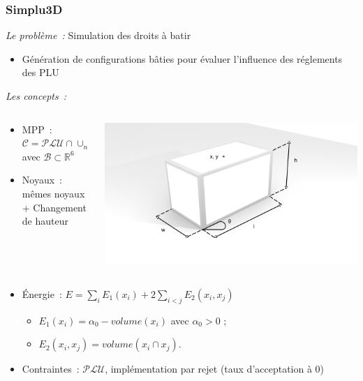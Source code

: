 \documentclass{beamer}
\begin{document}
\begin{frame}
\frametitle{Simplu3D}
\emph{Le probl\`eme~:}  Simulation des droits \`a batir
\begin{itemize}
\item Génération de configurations bâties pour évaluer l'influence des réglements des PLU
\end{itemize}
\emph{Les concepts~:}
\begin{columns}
\begin{column}{0.55\textwidth}
\begin{itemize}
\item MPP~:  $ \mathcal{C} =\mathcal{PLU} \cap \cup_{n} \mathcal{B}^n$  avec $\mathcal{B}  \subset  \mathds{R}^{6}$
\item Noyaux~: mêmes noyaux + Changement de hauteur
\end{itemize}
\end{column}
\begin{column}{0.45\textwidth}
 \includegraphics[width=\textwidth]{boiteFin.png}
\end{column}
\end{columns}
\begin{itemize}
\item Énergie~:  $E = \sum_i E_1(x_i) + 2\sum_{i<j} E_2(x_i,x_j)$
\begin{itemize}
\item $E_1(x_i)=\alpha_{0} - volume(x_i)$ avec $\alpha_{0}>0$ ;
\item $E_2(x_i,x_j) = volume(x_i \cap x_j)$.
\end{itemize}
\item Contraintes~:  $\mathcal{PLU}$, implémentation par rejet (taux d'acceptation à 0)
\end{itemize}
\end{frame}
\end{document}
